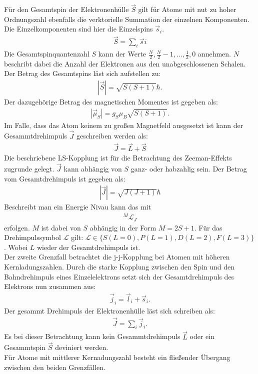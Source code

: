 Für den Gesamtspin der Elektronenhülle $\vec{S}$ gilt für Atome mit nut zu hoher Ordnungszahl ebenfalls die verktorielle Summation der einzelnen Komponenten.
Die Einzelkomponenten sind hier die Einzelspins $\vec{s}_i$.
\begin{align*}
  \vec{S} = \sum_{i}{\vec{s}i}
\end{align*}
Die Gesamtspinquantenzahl $S$ kann der Werte $\frac{N}{2}, \frac{N}{2}-1, ..., \frac{1}{2},0$ annehmen.
$N$ beschribt dabei die Anzahl der Elektronen aus den unabgeschlossenen Schalen.
Der Betrag des Gesamtspins läst sich aufstellen zu:
\begin{align*}
  |\vec{S}| = \sqrt{S(S+1)}\hbar.
\end{align*}
Der dazugehörige Betrag des magnetischen Momentes ist gegeben als:
\begin{align*}
  |\vec{\mu}_S| = g_S\mu_B\sqrt{S(S+1)}.
\end{align*}
Im Falle, dass das Atom keinem zu großen Magnetfeld ausgesetzt ist kann der Gesammtdrehimpuls $\vec{J}$ geschreiben werden als:
\begin{align*}
  \vec{J} = \vec{L}+ \vec{S}
\end{align*}
Die beschriebene LS-Kopplung ist für die Betrachtung des Zeeman-Effekts zugrunde gelegt.
$\vec{J}$ kann abhängig von $S$ ganz- oder habzahlig sein.
Der Betrag vom Gesamtdrehimpuls ist gegeben als:
\begin{align*}
  |\vec{J}| = \sqrt{J(J+1)}\hbar
\end{align*}
Beschreibt man ein Energie Nivau kann das mit
\begin{align*}
  {}^M\mathcal{L}_J
\end{align*}
erfolgen.
$M$ ist dabei von $S$ abhängig in der Form $M=2S+1$.
Für das Drehimpulssymbol $\mathcal{L}$ gilt:
$\mathcal{L}\in\{S(L=0), P(L=1), D(L=2), F(L=3)\}$.
Wobei $L$ wieder der Gesamtdrehimpuls ist.\\

Der zweite Grenzfall betrachtet die j-j-Kopplung bei Atomen mit höheren Kernladungszahlen.
Durch die starke Kopplung zwischen den Spin und den Bahndrehimpuls eines Einzelelektrons setzt sich der Gesamtdrehimpuls des Elektrons nun zusammen aus:
\begin{align*}
  \vec{j}_i = \vec{l}_i + \vec{s}_i.
\end{align*}
Der gesammt Drehimpuls der Elektronenhülle läst sich schreiben als:
\begin{align*}
  \vec{J}=\sum_i\vec{j}_i.
\end{align*}
Es bei dieser Betrachtung kann kein Gesammtdrehimpuls $\vec{L}$ oder ein Gesammtspin $\vec{S}$ deviniert werden.\\
Für Atome mit mittlerer Kernadungszahl besteht ein fließender Übergang zwischen den beiden Grenzfällen.

